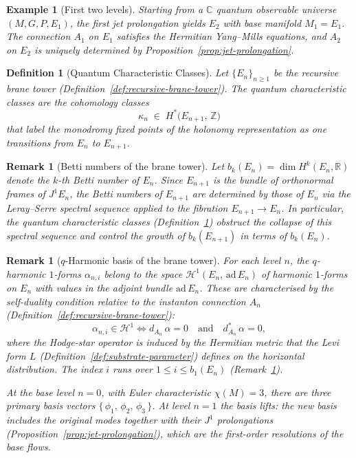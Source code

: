 \documentclass[12pt,a4paper]{report}
\newtheorem{definition}[theorem]{Definition}
\newtheorem{example}[theorem]{Example}
\newtheorem{remark}[theorem]{Remark}
\begin{document}
\begin{example}[First two levels]
\label{ex:brane-tower-levels}
Starting from a $\mathbb{C}$ quantum observable universe $(M, G, P, E_1)$, the
first jet prolongation yields $E_2$ with base manifold $M_1 = E_1$.  The
connection $A_1$ on $E_1$ satisfies the Hermitian Yang--Mills equations, and
$A_2$ on $E_2$ is uniquely determined by
Proposition~\ref{prop:jet-prolongation}.
\end{example}



\begin{definition}[Quantum Characteristic Classes]
\label{def:quantum-characteristic-classes}
Let $\{E_n\}_{n \geq 1}$ be the recursive brane tower
(Definition~\ref{def:recursive-brane-tower}).  The \emph{quantum
characteristic classes} are the cohomology classes
\[
  \kappa_n \;\in\; H^*\!\bigl(E_{n+1},\, \mathbb{Z}\bigr)
\]
that label the monodromy fixed points of the holonomy representation as one
transitions from $E_n$ to $E_{n+1}$.
\end{definition}



\begin{remark}[Betti numbers of the brane tower]
\label{rem:betti-numbers-brane}
Let $b_k(E_n) = \dim H^k(E_n, \mathbb{R})$ denote the $k$-th Betti number of
$E_n$.  Since $E_{n+1}$ is the bundle of orthonormal frames of $J^1 E_n$, the
Betti numbers of $E_{n+1}$ are determined by those of $E_n$ via the Leray--Serre
spectral sequence applied to the fibration
$E_{n+1} \to E_n$.  In particular, the quantum characteristic classes
(Definition~\ref{def:quantum-characteristic-classes}) obstruct the collapse of
this spectral sequence and control the growth of $b_k(E_{n+1})$ in terms of
$b_k(E_n)$.
\end{remark}



\begin{remark}[$q$-Harmonic basis of the brane tower]
\label{rem:q-harmonic-basis-brane}
For each level $n$, the $q$-harmonic $1$-forms $\alpha_{n,i}$ belong to the
space $\mathcal{H}^1(E_n,\, \mathrm{ad}\, E_n)$ of harmonic $1$-forms on
$E_n$ with values in the adjoint bundle $\mathrm{ad}\, E_n$.  These are
characterised by the self-duality condition relative to the instanton
connection $A_n$
(Definition~\ref{def:recursive-brane-tower}):
\[
  \alpha_{n,i} \in \mathcal{H}^1
  \iff
  d_{A_n}\,\alpha = 0
  \quad\text{and}\quad
  d_{A_n}^*\,\alpha = 0,
\]
where the Hodge-star operator is induced by the Hermitian metric that the
Levi form $L$ (Definition~\ref{def:substrate-parameter}) defines on the
horizontal distribution.
The index $i$ runs over $1 \leq i \leq b_1(E_n)$
(Remark~\ref{rem:betti-numbers-brane}).

At the base level $n = 0$, with Euler characteristic $\chi(M) = 3$, there are
three primary basis vectors $\{\,\phi_1,\, \phi_2,\, \phi_3\,\}$.  At
level $n = 1$ the basis lifts: the new basis includes the original modes
together with their $J^1$ prolongations
(Proposition~\ref{prop:jet-prolongation}), which are the first-order
resolutions of the base flows.
\end{remark}
\end{document}
